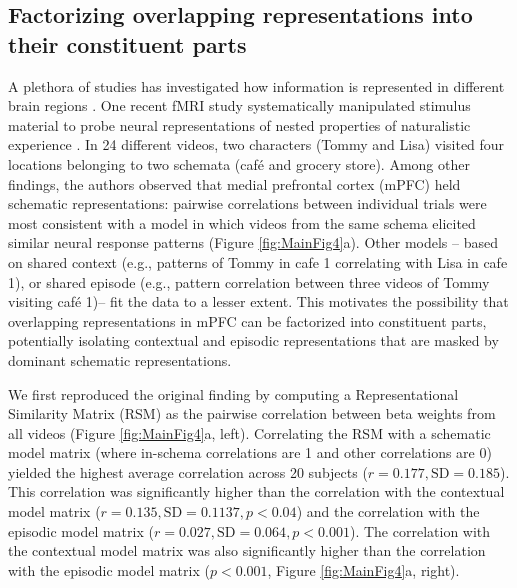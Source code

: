 \documentclass{article}
\begin{document}
\subsection*{Factorizing overlapping representations into their constituent parts}
%
A plethora of studies has investigated how information is represented in different brain regions \cite{kriegeskorteRepresentationalSimilarityAnalysis2008a}. One recent fMRI study systematically manipulated stimulus material to probe neural representations of nested properties of naturalistic experience \cite{reaghFlexibleReuseCorticohippocampal2023a}. In 24 different videos, two characters (Tommy and Lisa) visited four locations belonging to two schemata (caf\'e and grocery store). Among other findings, the authors observed that medial prefrontal cortex (mPFC) held schematic representations: pairwise correlations between individual trials were most consistent with a model in which videos from the same schema elicited similar neural response patterns (Figure \ref{fig:MainFig4}a). Other models -- based on shared context (e.g., patterns of Tommy in cafe 1 correlating with Lisa in cafe 1), or shared episode (e.g., pattern correlation between three videos of Tommy visiting caf\'e 1)-- fit the data to a lesser extent. This motivates the possibility that overlapping representations in mPFC can be factorized into constituent parts, potentially isolating contextual and episodic representations that are masked by dominant schematic representations.

We first reproduced the original finding by computing a Representational Similarity Matrix (RSM) as the pairwise correlation between beta weights from all videos (Figure \ref{fig:MainFig4}a, left). Correlating the RSM with a schematic model matrix (where in-schema correlations are 1 and other correlations are 0) yielded the highest average correlation across 20 subjects ($r = 0.177, \text{SD} = 0.185$). This correlation was significantly higher than the correlation with the contextual model matrix ($r = 0.135, \text{SD} = 0.1137, p < 0.04$) and the correlation with the episodic model matrix ($r = 0.027, \text{SD} = 0.064, p < 0.001$). The correlation with the contextual model matrix was also significantly higher than the correlation with the episodic model matrix ($p < 0.001$, Figure \ref{fig:MainFig4}a, right).
\end{document}
